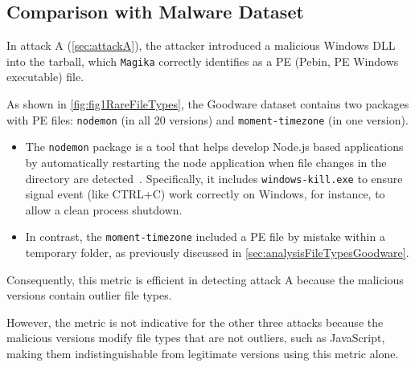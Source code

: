 \newpage
\subsection{Comparison with Malware Dataset}
\label{sec:analysisFileTypesComparisonMalware}

In attack A (\cref{sec:attackA}), the attacker introduced a malicious Windows \ac{DLL} into the tarball,
which \texttt{Magika} correctly identifies as a \ac{PE} (Pebin, PE Windows executable) file.

As shown in \cref{fig:fig1RareFileTypes}, the Goodware dataset contains two packages with \ac{PE} files: 
\texttt{nodemon} (in all 20 versions) and \texttt{moment-timezone} (in one version).

\begin{itemize}
    \item The \texttt{nodemon} package is a tool that helps develop Node.js based applications 
    by automatically restarting the node application when file changes in the directory are detected~\cite{nodemon}.
    Specifically, it includes \texttt{windows-kill.exe} to ensure signal event (like CTRL+C) work correctly on Windows, 
    for instance, to allow a clean process shutdown.

    \item In contrast, the \texttt{moment-timezone} included a \ac{PE} file by mistake within a temporary folder,
    as previously discussed in \cref{sec:analysisFileTypesGoodware}.

\end{itemize}

Consequently, this metric is efficient in detecting attack A because the malicious versions contain outlier file types.

However, the metric is not indicative for the other three attacks because the malicious versions modify file types that are not outliers, 
such as JavaScript, making them indistinguishable from legitimate versions using this metric alone.
